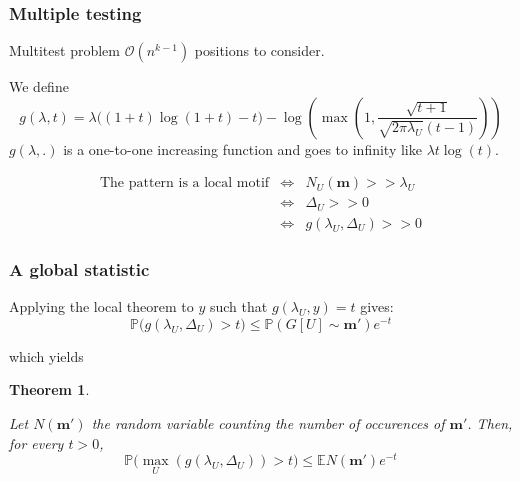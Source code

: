 \documentclass{beamer}
\newtheorem{thm}{Theorem}
\newcommand{\esp}{\mathbb{E}}
\newcommand{\proba}{\mathbb{P}}
\newcommand{\Num}{N_U(\mot)}
\newcommand{\mot}{\mathbf{m}}
\begin{document}
\begin{frame}
\frametitle{Multiple testing}

\begin{block}{Multitest problem}
$ \mathcal{O}(n^{k-1})$ positions to consider.
\end{block}

We define
\begin{equation*}\label{gdefinition}
g(\lambda,t) = \lambda \big( (1+t)\log(1+t) -t \big) - \log(\max(1,\frac{\sqrt{t+1}}{\sqrt{2\pi \lambda_U} (t-1)})) 
\end{equation*}
$g(\lambda,.)$ is a one-to-one increasing function and
goes to infinity like $\lambda t \log(t)$.

\begin{eqnarray*}
\mbox{The pattern is a local motif} & \Leftrightarrow & \Num >> \lambda_U \\ 
                              & \Leftrightarrow & \Delta_U >> 0 \\
                              & \Leftrightarrow & g(\lambda_U,\Delta_U) >> 0 
\end{eqnarray*}
\end{frame}


\begin{frame}
\frametitle{A global statistic}


Applying the local theorem to $y$ such that $g(\lambda_U,y)=t$ gives:
\begin{equation*}
 \proba \big(g(\lambda_U,\Delta_U) > t  \big)\leq \proba(G[U]\sim \mot') e^{-t} 
\end{equation*} 

which yields

\begin{thm}\label{main}

Let $N(\mot')$ the random variable counting the number of occurences of $\mot'$. Then, for every $t>0$, 
\begin{equation}
\proba \big(  \max_{U}(g(\lambda_U,\Delta_U))  > t  \big)  \leq  \esp N(\mot')    e^{-t} \label{globaleq}
\end{equation} 

\end{thm}




\end{frame}
\end{document}
